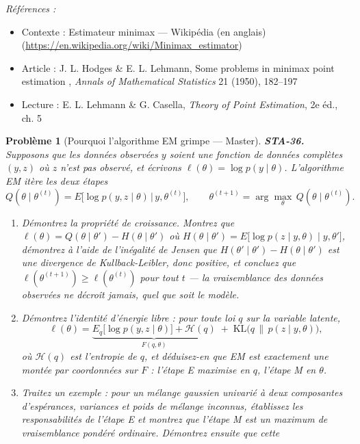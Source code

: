 \documentclass[11pt]{article}
\newtheorem{problem}{Problème}
\newenvironment{refs}{\par\small\noindent\emph{Références :}\begin{itemize}\setlength\itemsep{0pt}}{\end{itemize}\normalsize}
\begin{document}
\begin{refs}
\item Contexte : Estimateur minimax --- Wikipédia (en anglais) (\url{https://en.wikipedia.org/wiki/Minimax_estimator})
\item Article : J. L. Hodges \& E. L. Lehmann, \og{} Some problems in minimax point estimation \fg{}, \textit{Annals of Mathematical Statistics} 21 (1950), 182--197
\item Lecture : E. L. Lehmann \& G. Casella, \textit{Theory of Point Estimation}, 2e éd., ch. 5
\end{refs}

\bigskip

\begin{problem}[{Pourquoi l'algorithme EM grimpe --- Master}]
\textbf{STA-36.} Supposons que les données observées $ y $ soient une fonction de données
complètes $ (y, z) $ où $ z $ n'est pas observé, et écrivons
$ \ell(\theta) = \log p(y \mid \theta) $. L'algorithme EM itère les deux étapes
\[ Q(\theta \mid \theta^{(t)}) = E\big[ \log p(y, z \mid \theta) \,\big|\, y, \theta^{(t)} \big],
 \qquad
 \theta^{(t+1)} = \arg\max_{\theta} \, Q(\theta \mid \theta^{(t)}) . \]
\begin{enumerate}
\item[(a)] Démontrez la propriété de croissance. Montrez que
$ \ell(\theta) = Q(\theta \mid \theta') - H(\theta \mid \theta') $ où
$ H(\theta \mid \theta') = E\big[ \log p(z \mid y, \theta) \mid y, \theta' \big] $, démontrez à
l'aide de l'inégalité de Jensen que $ H(\theta' \mid \theta') - H(\theta \mid \theta') $ est une
divergence de Kullback-Leibler, donc positive, et concluez que
$ \ell(\theta^{(t+1)}) \ge \ell(\theta^{(t)}) $ pour tout $ t $ --- la vraisemblance des données
observées ne décroît jamais, quel que soit le modèle.
\item[(b)] Démontrez l'identité d'énergie libre : pour toute loi $ q $ sur la variable latente,
\[ \ell(\theta) = \underbrace{E_q\big[\log p(y,z \mid \theta)\big] + \mathcal{H}(q)}_{F(q,\theta)}
 \; + \; \mathrm{KL}\big( q \,\big\|\, p(z \mid y, \theta) \big) , \]
où $ \mathcal{H}(q) $ est l'entropie de $ q $, et déduisez-en que EM est exactement une montée
par coordonnées sur $ F $ : l'étape E maximise en $ q $, l'étape M en $ \theta $.
\item[(c)] Traitez un exemple : pour un mélange gaussien univarié à deux composantes d'espérances,
variances et poids de mélange inconnus, établissez les responsabilités de l'étape E et montrez que
l'étape M est un maximum de vraisemblance pondéré ordinaire. Démontrez ensuite que cette

\end{enumerate}
\end{problem}
\end{document}
